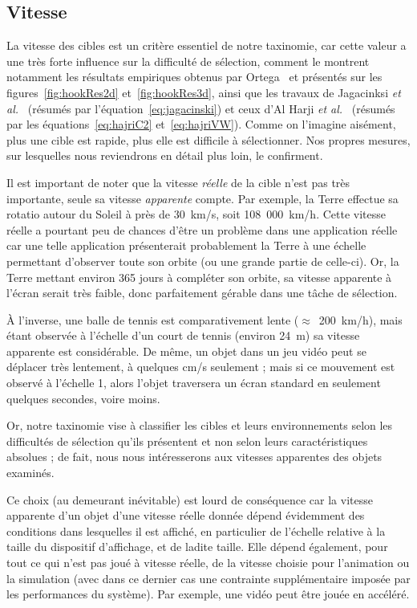     \subsection{Vitesse}
    La vitesse des cibles est un critère essentiel de notre taxinomie, car cette valeur a une très forte influence sur la difficulté de sélection, comment le montrent notamment les résultats empiriques obtenus par Ortega~\cite{ortega2013hook} et présentés sur les figures~\ref{fig:hookRes2d} et~\ref{fig:hookRes3d}, ainsi que les travaux de Jagacinksi \emph{et al.}~\cite{jagacinski1980test} (résumés par l'équation~\ref{eq:jagacinski}) et ceux d'Al Harji \emph{et al.}~\cite{hajri2011moving} (résumés par les équations~\ref{eq:hajriC2} et~\ref{eq:hajriVW}). Comme on l'imagine aisément, plus une cible est rapide, plus elle est difficile à sélectionner. Nos propres mesures, sur lesquelles nous reviendrons en détail plus loin, le confirment.
    
    Il est important de noter que la vitesse \emph{réelle} de la cible n'est pas très importante, seule sa vitesse \emph{apparente} compte. Par exemple, la Terre effectue sa rotatio autour du Soleil à près de 30~km/s, soit 108~000~km/h. Cette vitesse réelle a pourtant peu de chances d'être un problème dans une application réelle car une telle application présenterait probablement la Terre à une échelle permettant d'observer toute son orbite (ou une grande partie de celle-ci). Or, la Terre mettant environ 365 jours à compléter son orbite, sa vitesse apparente à l'écran serait très faible, donc parfaitement gérable dans une tâche de sélection.
    
    À l'inverse, une balle de tennis est comparativement lente ($\approx$~200~km/h), mais étant observée à l'échelle d'un court de tennis (environ 24~m) sa vitesse apparente est considérable. De même, un objet dans un jeu vidéo peut se déplacer très lentement, à quelques cm/s seulement ; mais si ce mouvement est observé à l'échelle 1, alors l'objet traversera un écran standard en seulement quelques secondes, voire moins.
    
    Or, notre taxinomie vise à classifier les cibles et leurs environnements selon les difficultés de sélection qu'ils présentent et non selon leurs caractéristiques absolues ; de fait, nous nous intéresserons aux vitesses apparentes des objets examinés.
    
    Ce choix (au demeurant inévitable) est lourd de conséquence car la vitesse apparente d'un objet d'une vitesse réelle donnée dépend évidemment des conditions dans lesquelles il est affiché, en particulier de l'échelle relative à la taille du dispositif d'affichage, et de ladite taille. Elle dépend également, pour tout ce qui n'est pas joué à vitesse réelle, de la vitesse choisie pour l'animation ou la simulation (avec dans ce dernier cas une contrainte supplémentaire imposée par les performances du système). Par exemple, une vidéo peut être jouée en accéléré.
    
